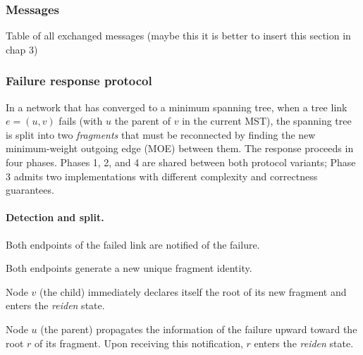 \documentclass{memoir}
\begin{document}
\subsubsection{Messages}
Table of all exchanged messages (maybe this it is better to insert this section in chap 3)

\subsubsection{Failure response protocol}


In a network that has converged to a minimum spanning tree, when a tree link
$e = (u, v)$ fails (with $u$ the parent of $v$ in the current MST), the spanning tree
is split into two \emph{fragments} that must be reconnected by finding the new
minimum-weight outgoing edge (MOE) between them.
The response proceeds in four phases. Phases 1, 2, and 4 are shared between both protocol
variants; Phase 3 admits two implementations with different complexity and correctness
guarantees.

\paragraph{Detection and split.}

Both endpoints of the failed link are notified of the failure.

Both endpoints generate a new unique fragment identity. %

Node $v$ (the child) immediately declares itself the root of its new fragment and enters
the \emph{reiden} state.

Node $u$ (the parent) propagates the information of the failure upward toward the root
$r$ of its fragment. Upon receiving this notification, $r$ enters the \emph{reiden} state.
\end{document}
